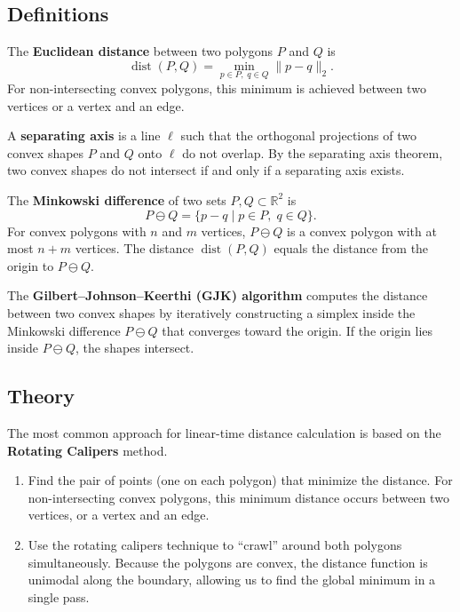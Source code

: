 \subsection{Definitions}

\begin{definition}\label{def:euclidean_poly_dist}
The \textbf{Euclidean distance} between two polygons $P$ and $Q$ is
\[
\operatorname{dist}(P, Q) = \min_{p \in P,\; q \in Q} \|p - q\|_2.
\]
For non-intersecting convex polygons, this minimum is achieved between two vertices or a vertex and an edge.
\end{definition}

\begin{definition}\label{def:separating_axis}
A \textbf{separating axis} is a line $\ell$ such that the orthogonal projections of two convex shapes $P$ and $Q$ onto $\ell$ do not overlap. By the separating axis theorem, two convex shapes do not intersect if and only if a separating axis exists.
\end{definition}

\begin{definition}\label{def:minkowski_difference}
The \textbf{Minkowski difference} of two sets $P, Q \subset \mathbb{R}^2$ is
\[
P \ominus Q = \{p - q \mid p \in P,\; q \in Q\}.
\]
For convex polygons with $n$ and $m$ vertices, $P \ominus Q$ is a convex polygon with at most $n + m$ vertices. The distance $\operatorname{dist}(P,Q)$ equals the distance from the origin to $P \ominus Q$.
\end{definition}

\begin{definition}\label{def:gjk}
The \textbf{Gilbert--Johnson--Keerthi (GJK) algorithm} computes the distance between two convex shapes by iteratively constructing a simplex inside the Minkowski difference $P \ominus Q$ that converges toward the origin. If the origin lies inside $P \ominus Q$, the shapes intersect.
\end{definition}

\subsection{Theory}
The most common approach for linear-time distance calculation is based on the \textbf{Rotating Calipers} method.
\begin{enumerate}
    \item Find the pair of points (one on each polygon) that minimize the distance. For non-intersecting convex polygons, this minimum distance occurs between two vertices, or a vertex and an edge.
    \item Use the rotating calipers technique to ``crawl'' around both polygons simultaneously. Because the polygons are convex, the distance function is unimodal along the boundary, allowing us to find the global minimum in a single pass.
\end{enumerate}

